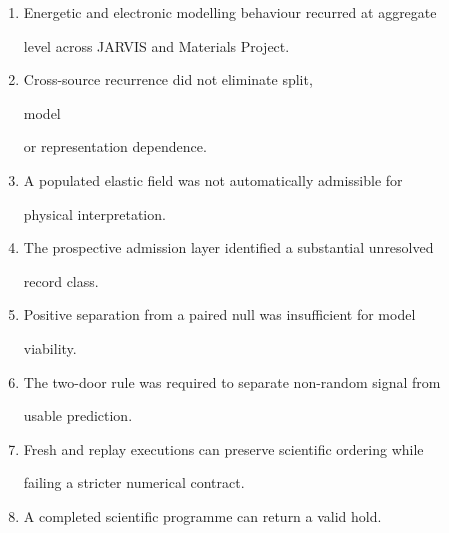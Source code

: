 \documentclass[11pt,a4paper,oneside]{report}
\begin{document}
\begin{enumerate}



\item

Energetic and electronic modelling behaviour recurred at aggregate

level across JARVIS and Materials Project.



\item

Cross-source recurrence did not eliminate split,

model

or representation dependence.



\item

A populated elastic field was not automatically admissible for

physical interpretation.



\item

The prospective admission layer identified a substantial unresolved

record class.



\item

Positive separation from a paired null was insufficient for model

viability.



\item

The two-door rule was required to separate non-random signal from

usable prediction.



\item

Fresh and replay executions can preserve scientific ordering while

failing a stricter numerical contract.



\item

A completed scientific programme can return a valid hold.



\end{enumerate}
\end{document}

